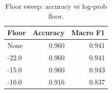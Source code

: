 \begin{table}[htbp]
\centering
\small
\begin{tabular}{lrr}
\toprule
\textbf{Floor} & \textbf{Accuracy} & \textbf{Macro F1} \\
\midrule
None & 0.960 & 0.941 \\
-22.0 & 0.960 & 0.941 \\
-15.0 & 0.960 & 0.943 \\
-10.0 & 0.916 & 0.837 \\
\bottomrule
\end{tabular}
\caption{Floor sweep: accuracy vs log-prob floor.}
\label{tab:floor-sweep}
\end{table}
